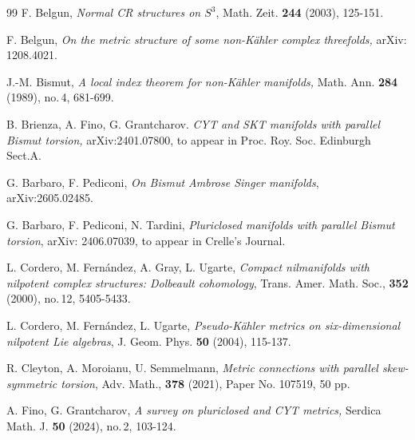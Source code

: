 \documentclass{amsart}
\numberwithin{equation}{section}
\theoremstyle{definition}
\renewcommand{\1}{\mathds{1}}
\renewcommand{\>}{\rightarrow}
\begin{document}
\begin{thebibliography}{99}
 F. Belgun,
\newblock \textit{Normal CR structures on $S^3$},
\newblock Math. Zeit. \textbf{244} (2003), 125-151.

 F. Belgun,
\newblock \textit{On the metric structure of some non-K\"ahler complex threefolds,}
\newblock arXiv: 1208.4021.

 J.-M. Bismut,
\newblock \textit{A local index theorem for non-K\"ahler manifolds,}
\newblock Math. Ann. {\bf 284} (1989), no.\,4, 681-699.


 B. Brienza, A. Fino, G. Grantcharov.
\newblock \textit{CYT and SKT manifolds with parallel Bismut torsion,}
\newblock arXiv:2401.07800, to appear in Proc. Roy. Soc. Edinburgh Sect.A.

 G. Barbaro, F. Pediconi,
\newblock \textit{On Bismut Ambrose Singer manifolds},
\newblock arXiv:2605.02485.

 G. Barbaro, F. Pediconi, N. Tardini,
\newblock \textit{Pluriclosed manifolds with parallel Bismut torsion},
\newblock arXiv: 2406.07039, to appear in Crelle's Journal.




 L. Cordero, M. Fern\'{a}ndez, A. Gray, L. Ugarte,
\newblock \textit{Compact nilmanifolds with nilpotent complex structures: Dolbeault cohomology},
\newblock Trans. Amer. Math. Soc., \textbf{352} (2000), no.\,12, 5405-5433.

 L. Cordero, M. Fern\'{a}ndez, L. Ugarte,
\newblock \textit{Pseudo-K\"ahler metrics on six-dimensional nilpotent Lie algebras},
\newblock J. Geom. Phys. \textbf{50} (2004), 115-137.

 R. Cleyton, A. Moroianu, U. Semmelmann,
\newblock \textit{Metric connections with parallel skew-symmetric torsion},
\newblock Adv. Math., \textbf{378} (2021), Paper No. 107519, 50 pp.

 A. Fino, G. Grantcharov,
\newblock \textit{A survey on pluriclosed and CYT metrics,}
\newblock Serdica Math. J. \textbf{50} (2024), no.\,2, 103-124.




\end{thebibliography}
\end{document}
